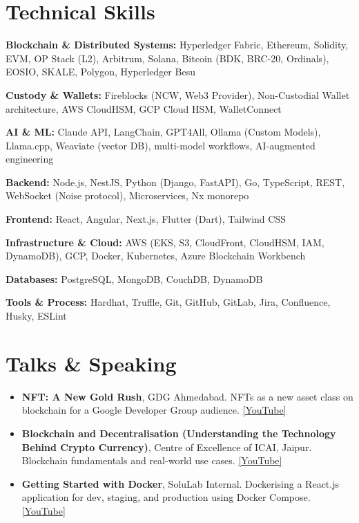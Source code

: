 \documentclass[11pt, a4paper]{article}
\newcommand{\skilltag}[1]{\textbf{#1:}\;}
\begin{document}
\section{Technical Skills}

\noindent
\skilltag{Blockchain \& Distributed Systems}
Hyperledger Fabric, Ethereum, Solidity, EVM, OP Stack (L2), Arbitrum, Solana, Bitcoin (BDK, BRC-20, Ordinals), EOSIO, SKALE, Polygon, Hyperledger Besu

\vspace{3pt}
\noindent
\skilltag{Custody \& Wallets}
Fireblocks (NCW, Web3 Provider), Non-Custodial Wallet architecture, AWS CloudHSM, GCP Cloud HSM, WalletConnect

\vspace{3pt}
\noindent
\skilltag{AI \& ML}
Claude API, LangChain, GPT4All, Ollama (Custom Models), Llama.cpp, Weaviate  (vector DB), multi-model workflows, AI-augmented engineering

\vspace{3pt}
\noindent
\skilltag{Backend}
Node.js, NestJS, Python (Django, FastAPI), Go, TypeScript, REST, WebSocket (Noise protocol), Microservices, Nx monorepo

\vspace{3pt}
\noindent
\skilltag{Frontend}
React, Angular, Next.js, Flutter (Dart), Tailwind CSS

\vspace{3pt}
\noindent
\skilltag{Infrastructure \& Cloud}
AWS (EKS, S3, CloudFront, CloudHSM, IAM, DynamoDB), GCP, Docker, Kubernetes, Azure Blockchain Workbench

\vspace{3pt}
\noindent
\skilltag{Databases}
PostgreSQL, MongoDB, CouchDB, DynamoDB

\vspace{3pt}
\noindent
\skilltag{Tools \& Process}
Hardhat, Truffle, Git, GitHub, GitLab, Jira, Confluence, Husky, ESLint

\section{Talks \& Speaking}

\begin{itemize}
  \item \textbf{NFT: A New Gold Rush}, GDG Ahmedabad. NFTs as a new asset class on blockchain for a Google Developer Group audience. \href{https://www.youtube.com/watch?v=KYRgwRG-LF8}{\small[YouTube]}
  \item \textbf{Blockchain and Decentralisation (Understanding the Technology Behind Crypto Currency)}, Centre of Excellence of ICAI, Jaipur. Blockchain fundamentals and real-world use cases. \href{https://www.youtube.com/watch?v=ONUzNrt9plc}{\small[YouTube]}
  \item \textbf{Getting Started with Docker}, SoluLab Internal. Dockerising a React.js application for dev, staging, and production using Docker Compose. \href{https://www.youtube.com/watch?v=rvjnvZ6utpM}{\small[YouTube]}
\end{itemize}
\end{document}
